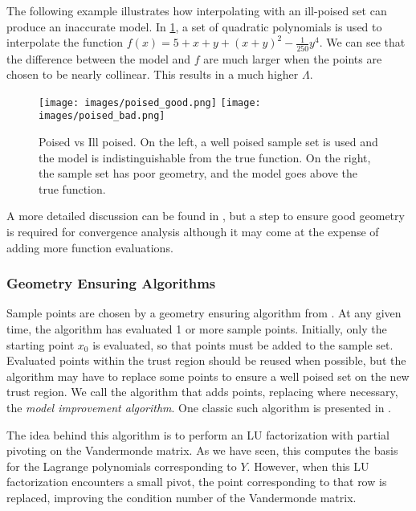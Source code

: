 The following example illustrates how interpolating with an ill-poised set can produce an inaccurate model.
In \cref{pvip}, a set of quadratic polynomials is used to interpolate the function $f(x) = 5 + x + y + (x + y) ^ 2 - \frac 1 {250} y ^ 4$.
We can see that the difference between the model and $f$ are much larger when the points are chosen to be nearly collinear.
This results in a much higher $\Lambda$.

\begin{figure}[h]
    \centering
    \texttt{[image: images/poised\_good.png]}
    \texttt{[image: images/poised\_bad.png]}
    \caption{
		Poised vs Ill poised.
		On the left, a well poised sample set is used and the model is indistinguishable from the true function.
		On the right, the sample set has poor geometry, and the model goes above the true function.
	}
    \label{pvip}
\end{figure}


A more detailed discussion can be found in \cite{doi:10.1080/10556780802409296}, but a step to ensure good geometry is required for convergence analysis although it may come at the expense of adding more function evaluations.

\subsubsection{Geometry Ensuring Algorithms}

Sample points are chosen by a geometry ensuring algorithm from \cite{DUMMY:intro_book}.
At any given time, the algorithm has evaluated 1 or more sample points.
Initially, only the starting point $x_0$ is evaluated, so that points must be added to the sample set.
Evaluated points within the trust region should be reused when possible, but the algorithm may have to replace some points to ensure a well poised set on the new trust region.
We call the algorithm that adds points, replacing where necessary, the \emph{model improvement algorithm}.
One classic such algorithm is presented in \cite{DUMMY:intro_book}.

The idea behind this algorithm is to perform an LU factorization with partial pivoting on the Vandermonde matrix.
As we have seen, this computes the basis for the Lagrange polynomials corresponding to $Y$.
However, when this LU factorization encounters a small pivot, the point corresponding to that row is replaced, improving the condition number of the Vandermonde matrix.

